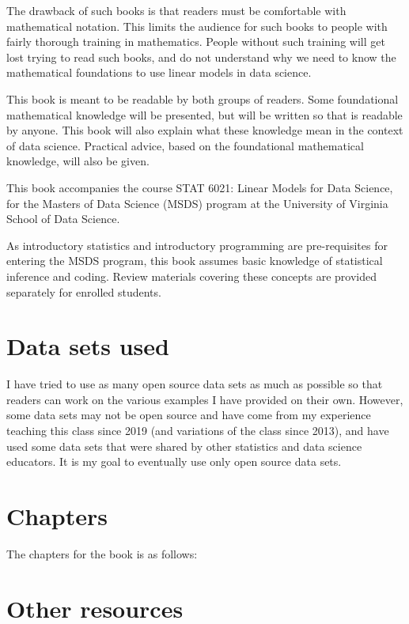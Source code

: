 \documentclass[
]{book}
\begin{document}
The drawback of such books is that readers must be comfortable with mathematical notation. This limits the audience for such books to people with fairly thorough training in mathematics. People without such training will get lost trying to read such books, and do not understand why we need to know the mathematical foundations to use linear models in data science.

This book is meant to be readable by both groups of readers. Some foundational mathematical knowledge will be presented, but will be written so that is readable by anyone. This book will also explain what these knowledge mean in the context of data science. Practical advice, based on the foundational mathematical knowledge, will also be given.

This book accompanies the course STAT 6021: Linear Models for Data Science, for the Masters of Data Science (MSDS) program at the University of Virginia School of Data Science.

As introductory statistics and introductory programming are pre-requisites for entering the MSDS program, this book assumes basic knowledge of statistical inference and coding. Review materials covering these concepts are provided separately for enrolled students.

\hypertarget{data-sets-used}{%
\section*{Data sets used}\label{data-sets-used}}

I have tried to use as many open source data sets as much as possible so that readers can work on the various examples I have provided on their own. However, some data sets may not be open source and have come from my experience teaching this class since 2019 (and variations of the class since 2013), and have used some data sets that were shared by other statistics and data science educators. It is my goal to eventually use only open source data sets.

\hypertarget{chapters}{%
\section*{Chapters}\label{chapters}}

The chapters for the book is as follows:

\hypertarget{other-resources}{%
\section*{Other resources}\label{other-resources}}
\end{document}
